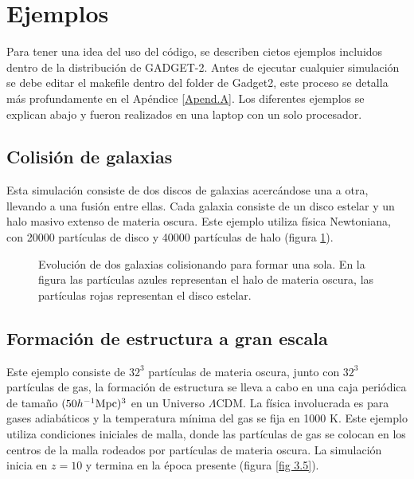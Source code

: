 \documentclass[a4paper,openright,12pt]{book}
\begin{document}
\section{Ejemplos}
Para tener una idea del uso del código, se describen cietos ejemplos incluidos dentro de la distribución de GADGET-2. Antes de ejecutar cualquier simulación se debe editar el \textsf{makefile} dentro del folder de \textsf{Gadget2}, este proceso se detalla más profundamente en el Apéndice \ref{Apend.A}. Los diferentes ejemplos se explican abajo y fueron realizados en una laptop con un solo procesador.

\subsection{Colisión de galaxias}
Esta simulación consiste de dos discos de galaxias acercándose una a otra, llevando a una fusión entre ellas. Cada galaxia consiste de un disco estelar y un halo masivo extenso de materia oscura. Este ejemplo utiliza física Newtoniana, con 20000 partículas de disco y 40000 partículas de halo (figura \ref{fig 3.3}). 

\begin{figure}[htpb]
\centering
{}
\caption{\footnotesize{Evolución de dos galaxias colisionando para formar una sola. En la figura las partículas azules representan el halo de materia oscura, las partículas rojas representan el disco estelar.}} \label{fig 3.3}
\end{figure}

\subsection{Formación de estructura a gran escala}
Este ejemplo consiste de $32^{3}$ partículas de materia oscura, junto con $32^{3}$ partículas de gas, la formación de estructura se lleva a cabo en una caja periódica de tamaño $(50 h^{-1} \textup{Mpc})^{3}$ en un Universo $\Lambda$CDM. La física involucrada es para gases adiabáticos y la temperatura mínima del gas se fija en 1000 K. Este ejemplo utiliza condiciones iniciales de malla, donde las partículas de gas se colocan en los centros de la malla rodeados por partículas de materia oscura. La simulación inicia en $z = 10$ y termina en la época presente (figura \ref{fig 3.5}).
\end{document}
